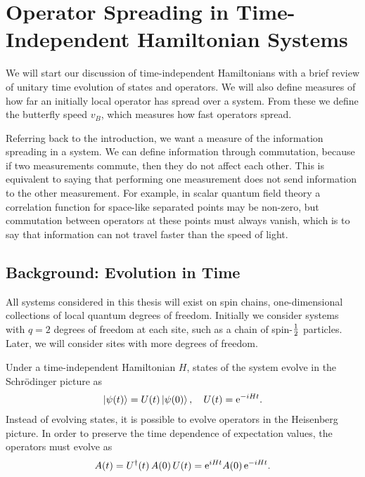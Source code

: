 \section{Operator Spreading in Time-Independent Hamiltonian Systems} \label{sec:opsp}

We will start our discussion of time-independent Hamiltonians with a brief review of unitary time evolution of states and operators. We will also define measures of how far an initially local operator has spread over a system. From these we define the butterfly speed $v_B$, which measures how fast operators spread.

Referring back to the introduction, we want a measure of the information spreading in a system. We can define information through commutation, because if two measurements commute, then they do not affect each other. This is equivalent to saying that performing one measurement does not send information to the other measurement. For example, in scalar quantum field theory a correlation function for space-like separated points may be non-zero, but commutation between operators at these points must always vanish, which is to say that information can not travel faster than the speed of light.

\subsection{Background: Evolution in Time} \label{sub:evoltime}

All systems considered in this thesis will exist on spin chains, one-dimensional collections of  local quantum degrees of freedom. Initially we consider systems with $q=2$ degrees of freedom at each site, such as a chain of spin-$\frac{1}{2}$ particles. Later, we will consider sites with more degrees of freedom. 

Under a time-independent Hamiltonian $H$, states of the system evolve in the Schr\"odinger picture as 
\begin{align}
\left|\psi(t)\right\rangle = U(t)\left|\psi(0)\right\rangle,\quad U(t) = \text{e}^{-iHt}. \label{eqn:shro}
\end{align}
Instead of evolving states, it is possible to evolve operators in the Heisenberg picture. In order to preserve the time dependence of expectation values, the operators must evolve as 
\begin{align}
A(t) = U^\dag(t)\,A(0)\,U(t) = \text{e}^{iHt}A(0)\,\text{e}^{-iHt}.\label{eqn:heis}
\end{align}

